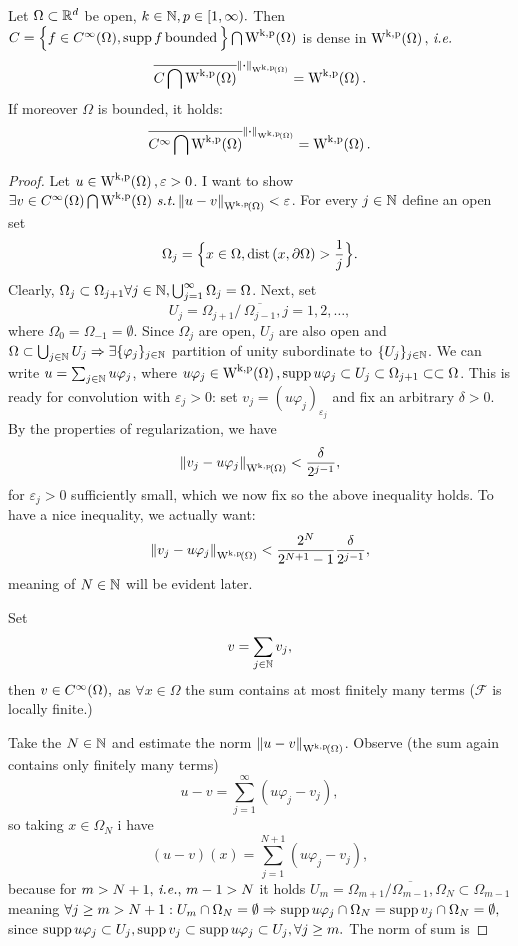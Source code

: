 \documentclass{article}
\begin{document}
\begin{theorem}
	Let $\Omega \subset {\mathbb R}^d$ be open, $k \in {\mathbb N}, p \in [1,\infty).$ Then $C = \Big\{ f \in C^\infty(\Omega), \supp f \, \text{bounded} \,\Big\} \bigcap \WkpSet{\Omega}$ is dense in $\WkpSet{\Omega}, \, \text{\textit{i.e.}} \,$
	\[
		\overline{C \bigcap \WkpSet{\Omega}}^{\norm{\vdot}_{\WkpSet{\Omega}}} = \WkpSet{\Omega}.
	\]
	If moreover $\Omega$ is bounded, it holds:
	\[
		\overline{C^{\infty}\bigcap \WkpSet{\Omega}}^{\norm{\vdot}_{\WkpSet{\Omega}}} = \WkpSet{\Omega}.
	\]
\end{theorem}
\begin{proof}
	Let $u \in \WkpSet{\Omega}, \varepsilon >0$. I want to show $\exists v \in C^\infty(\Omega) \bigcap \WkpSet{\Omega} \, \text{\textit{s.t.}} \, \norm{u-v}_{\WkpSet{\Omega}} < \varepsilon$.
For every $j \in {\mathbb N}$ define an open set
	\[
		\Omega_j = \Big\{ x \in \Omega, \operatorname{dist}\qty(x,\partial \Omega) > \frac{1}{j}\Big\}.
	\]
	Clearly, $\Omega_j \subset \Omega_{j+1} \forall j \in {\mathbb N}, \bigcup_{j=1}^\infty \Omega_j =\Omega$. Next, set
	\[
		U_j = \Omega_{j+1} /\,  \overline{\Omega_{j-1}}, j=1,2, \dots,
	\]
	where $\Omega_0 = \Omega_{-1} = \emptyset$. Since $\Omega_j$ are open, $U_j$ are also open and $\Omega \subset \bigcup_{j \in {\mathbb N}}U_j  \Rightarrow \exists \{\varphi_j\}_{j\in {\mathbb N}} $ partition of unity subordinate to $\{U_j\}_{j \in {\mathbb N}}$. We can write $u = \sum_{j \in {\mathbb N}} u \varphi_j$, where $u \varphi_j \in \WkpSet{\Omega}, \supp u \varphi_j \subset U_j \subset \Omega_{j+1} \subset \subset \Omega$. This is ready for convolution with $\varepsilon_j >0$: set $ v_j = (u \varphi_j)_{\varepsilon_j}$ and fix an arbitrary $\delta>0.$ By the properties of regularization, we have
	\[
		\norm{v_j - u \varphi_j }_{\WkpSet{\Omega}} < \frac{\delta}{2^{j-1}},
	\]
	for $\varepsilon_j > 0$ sufficiently small, which we now fix so the above inequality holds. To have a nice inequality, we actually want:
	\[
		\norm{v_j - u \varphi_j}_{\WkpSet{\Omega}} < \frac{2^N}{2^{N+1}-1} \frac{\delta}{2^{j-1}},
	\]
	meaning of $N \in {\mathbb N}$ will be evident later. 


	Set
	\[
		v = \sum_{j\in {\mathbb N}} v_j,
	\]
	then $v \in C^{\infty}\qty(\Omega),$ as $\forall x \in \Omega$ the sum contains at most finitely many terms ($ \mathcal{F}$ is locally finite.)


	Take the $N \in {\mathbb N}$ and estimate the norm $\norm{u-v}_{\WkpSet{\Omega}}$. Observe (the sum again contains only finitely many terms)
	\[
		u-v = \sum_{j=1}^\infty(u \varphi_j - v_j),
	\]
	so taking $x \in \Omega_N$ i have
	\[
		(u-v)(x) = \sum_{j=1}^{N+1}(u \varphi_j - v_j),
	\]
		because for $m > N+1, \, \text{\textit{i.e.}}, \, m-1 >N$ it holds $U_m = \Omega_{m+1}/ \overline{\Omega_{m-1}}, \Omega_N \subset \Omega_{m-1}$ meaning $\forall j \geq m > N+1: U_m \cap \Omega_N = \emptyset \Rightarrow \operatorname{supp} u \varphi_j \cap \Omega_N = \operatorname{supp} v_j \cap \Omega_N = \emptyset,$ since $\operatorname{supp} u \varphi_j \subset U_j, \operatorname{supp} v_j \subset \operatorname{supp} u \varphi_j \subset U_j, \forall j \geq m.$ 
	The norm of sum is


\end{proof}
\end{document}
